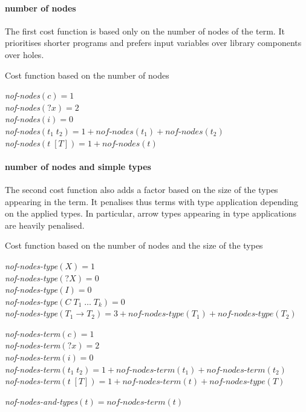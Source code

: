   \paragraph{number of nodes}
The first cost function is based only on the number of nodes of the term. It prioritises shorter programs and prefers input variables over library components over holes.
%
\begin{algorithm}
\caption{Cost function based on the number of nodes}

\textit{nof-nodes}$(c) = 1$\\
\textit{nof-nodes}$({?x}) = 2$\\
\textit{nof-nodes}$(i) = 0$\\
\textit{nof-nodes}$(t_1\; t_2) = 1 + \textit{nof-nodes}(t_1) + \textit{nof-nodes}(t_2)$\\
\textit{nof-nodes}$(t\; [T]) = 1 + \textit{nof-nodes}(t)$\\

\end{algorithm} 
%
  \paragraph{number of nodes and simple types}
The second cost function also adds a factor based on the size of the types appearing in the term. It penalises thus terms with type application depending on the applied types. In particular, arrow types appearing in type applications are heavily penalised.
%
\begin{algorithm}
\caption{Cost function based on the number of nodes and the size of the types}

\textit{nof-nodes-type}$(X) = 1$\\
\textit{nof-nodes-type}$({?X}) = 0$\\
\textit{nof-nodes-type}$(I) = 0$\\
\textit{nof-nodes-type}$(C\; T_1\; \ldots\; T_k) = 0$\\
\textit{nof-nodes-type}$(T_1 \rightarrow T_2) = 3 + \textit{nof-nodes-type}(T_1) + \textit{nof-nodes-type}(T_2)$\\

\BlankLine

\textit{nof-nodes-term}$(c) = 1$\\
\textit{nof-nodes-term}$({?x}) = 2$\\
\textit{nof-nodes-term}$(i) = 0$\\
\textit{nof-nodes-term}$(t_1\; t_2) = 1 + \textit{nof-nodes-term}(t_1) + \textit{nof-nodes-term}(t_2)$\\
\textit{nof-nodes-term}$(t\; [T]) = 1 + \textit{nof-nodes-term}(t) + \textit{nof-nodes-type}(T)$\\

\BlankLine

\textit{nof-nodes-and-types}$(t) = \textit{nof-nodes-term}(t)$
\end{algorithm} 
%

